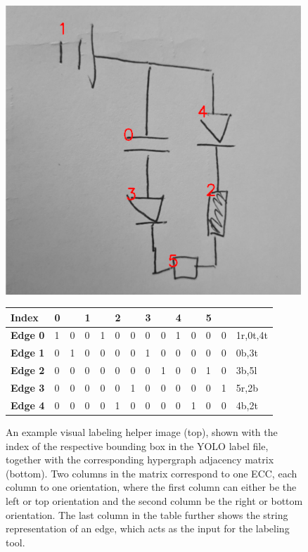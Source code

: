 \begin{figure}
\begin{center}

    \includegraphics[width=11.1cm]{imgs/topology_label_idx_example.png}
    \vspace{2cm}

    \begin{tabular}{|l||l|l|l|l|l|l|l|l|l|l|l|l||l|}

    \hline
	\textbf{Index}  & 0 &   & 1 &   & 2 &   & 3 &   & 4 &   & 5 &   & \\
    \hline\hline
	\textbf{Edge 0} & 1 & 0 & 0 & 1 & 0 & 0 & 0 & 0 & 1 & 0 & 0 & 0 & 1r,0t,4t \\
    \hline
    \textbf{Edge 1} & 0 & 1 & 0 & 0 & 0 & 0 & 1 & 0 & 0 & 0 & 0 & 0 & 0b,3t    \\
    \hline
    \textbf{Edge 2} & 0 & 0 & 0 & 0 & 0 & 0 & 0 & 1 & 0 & 0 & 1 & 0 & 3b,5l    \\
    \hline
    \textbf{Edge 3} & 0 & 0 & 0 & 0 & 0 & 1 & 0 & 0 & 0 & 0 & 0 & 1 & 5r,2b    \\
    \hline
    \textbf{Edge 4} & 0 & 0 & 0 & 0 & 1 & 0 & 0 & 0 & 0 & 1 & 0 & 0 & 4b,2t    \\
    \hline

    \end{tabular}

    \caption{An example visual labeling helper image (top), shown with the index of the respective bounding box in the YOLO label file, together with the corresponding hypergraph adjacency matrix (bottom). Two columns in the matrix correspond to one \ac{ECC}, each column to one orientation, where the first column can either be the left or top orientation and the second column be the right or bottom orientation. The last column in the table further shows the string representation of an edge, which acts as the input for the labeling tool.}
    \label{fig:example_topology_label}

\end{center}
\end{figure}

